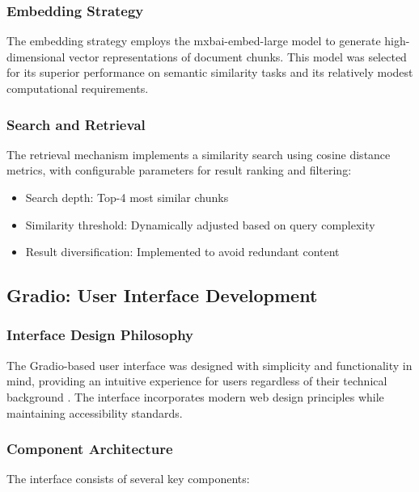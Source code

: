\subsubsection{Embedding Strategy}

The embedding strategy employs the mxbai-embed-large model to generate high-dimensional vector representations of document chunks. This model was selected for its superior performance on semantic similarity tasks and its relatively modest computational requirements.

\subsubsection{Search and Retrieval}

The retrieval mechanism implements a similarity search using cosine distance metrics, with configurable parameters for result ranking and filtering:

\begin{itemize}
    \item Search depth: Top-4 most similar chunks
    \item Similarity threshold: Dynamically adjusted based on query complexity
    \item Result diversification: Implemented to avoid redundant content
\end{itemize}

\subsection{Gradio: User Interface Development}

\subsubsection{Interface Design Philosophy}

The Gradio-based user interface was designed with simplicity and functionality in mind, providing an intuitive experience for users regardless of their technical background \citep{abid2019gradio}. The interface incorporates modern web design principles while maintaining accessibility standards.

\subsubsection{Component Architecture}

The interface consists of several key components:

